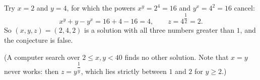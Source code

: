 Try $x=2$ and $y=4$, for which the powers $x^y=2^4=16$ and $y^x=4^2=16$ cancel:
\[x^y+y-y^x=16+4-16=4,\qquad z=4^{\dfrac12}=2.\]
So $(x,y,z)=\boxed{(2,4,2)}$ is a solution with all three numbers greater than $1$, and the conjecture is false.

(A computer search over $2\le x,y<40$ finds no other solution. Note that $x=y$ never works: then $z=y^{\dfrac1y}$, which lies strictly between $1$ and $2$ for $y\ge2$.)
